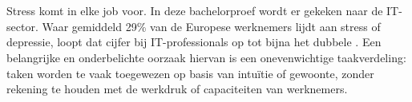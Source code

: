 
%
%
%
%
%

%



\chapter*{}
\vspace{1em}Stress komt in elke job voor. In deze bachelorproef wordt er gekeken naar de IT-sector. Waar gemiddeld 29\% van de Europese werknemers lijdt aan stress of depressie, loopt dat cijfer bij IT-professionals op tot bijna het dubbele \autocite{ISACA2025}. Een belangrijke en onderbelichte oorzaak hiervan is een onevenwichtige taakverdeling: taken worden te vaak toegewezen op basis van intuïtie of gewoonte, zonder rekening te houden met de werkdruk of capaciteiten van werknemers.

